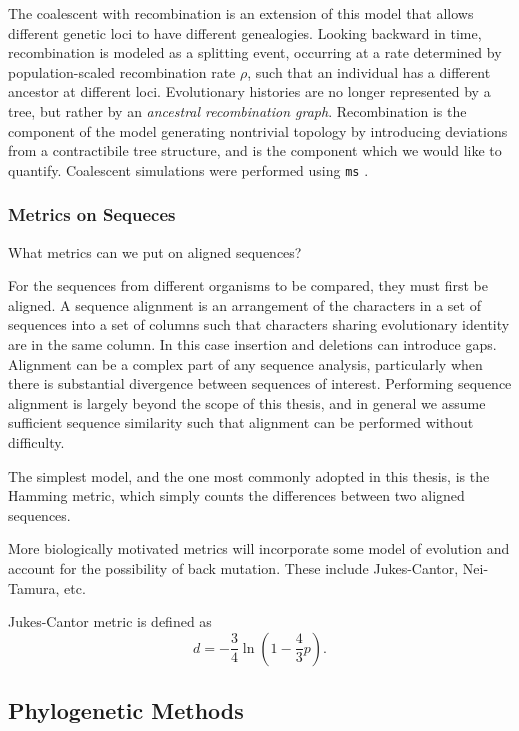 The coalescent with recombination is an extension of this model that allows different genetic loci to have different genealogies.
Looking backward in time, recombination is modeled as a splitting event, occurring at a rate determined by population-scaled recombination rate $\rho$, such that an individual has a different ancestor at different loci.
Evolutionary histories are no longer represented by a tree, but rather by an \emph{ancestral recombination graph}.
Recombination is the component of the model generating nontrivial topology by introducing deviations from a contractibile tree structure, and is the component which we would like to quantify.
Coalescent simulations were performed using \texttt{ms} \cite{Hudson:2002}.

\subsubsection{Metrics on Sequeces}


What metrics can we put on aligned sequences?

For the sequences from different organisms to be compared, they must first be aligned.
A sequence alignment is an arrangement of the characters in a set of sequences into a set of columns such that characters sharing evolutionary identity are in the same column.
In this case insertion and deletions can introduce gaps.
Alignment can be a complex part of any sequence analysis, particularly when there is substantial divergence between sequences of interest.
Performing sequence alignment is largely beyond the scope of this thesis, and in general we assume sufficient sequence similarity such that alignment can be performed without difficulty.

The simplest model, and the one most commonly adopted in this thesis, is the Hamming metric, which simply counts the differences between two aligned sequences.

More biologically motivated metrics will incorporate some model of evolution and account for the possibility of back mutation.
These include Jukes-Cantor, Nei-Tamura, etc.

Jukes-Cantor metric is defined as 
\begin{equation}
d=-\frac{3}{4}\ln(1-\frac{4}{3}p).
\end{equation}

\subsection{Phylogenetic Methods}

